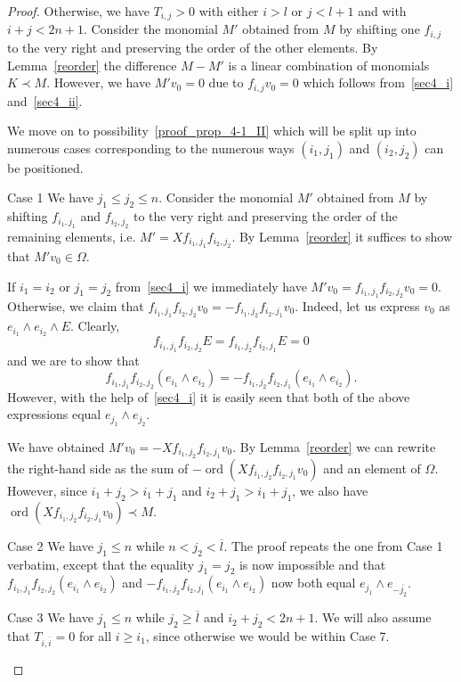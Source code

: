 \documentclass[10pt,a4paper]{article}
\theoremstyle{remark}\newtheorem{rema}[theo]{Remark}
\newenvironment{enonce*}[2][]{\par\smallskip\noindent\textbf{#2.}\ }{\par\smallskip}
\DeclareMathOperator{\ord}{ord}
\begin{document}
\begin{proof}
Otherwise, we have $T_{i,j}>0$ with either $i>l$ or $j<l+1$ and with $i+j<2n+1$. Consider the monomial $M'$ obtained from $M$ by shifting one $f_{i,j}$ to the very right and preserving the order of the other elements. By Lemma~\ref{reorder} the difference $M-M'$ is a linear combination of monomials $K\prec M$. However, we have $M'v_0=0$ due to $f_{i,j}v_0=0$ which follows from~\ref{sec4_i} and~\ref{sec4_ii}.

We move on to possibility~\ref{proof_prop_4-1_II} which will be split up into numerous cases corresponding to the numerous ways $(i_1,j_1)$ and $(i_2,j_2)$ can be positioned.

\begin{enonce*}[remark]{Case 1} We have $j_1\le j_2\le n$. Consider the monomial $M'$ obtained from $M$ by shifting $f_{i_1,j_1}$ and $f_{i_2,j_2}$ to the very right and preserving the order of the remaining elements, i.e. $M'=X f_{i_1,j_1}f_{i_2,j_2}$. By Lemma~\ref{reorder} it suffices to show that $M'v_0\in\Omega$.

If $i_1=i_2$ or $j_1=j_2$ from~\ref{sec4_i} we immediately have $M'v_0=f_{i_1,j_1}f_{i_2,j_2}v_0=0$. Otherwise, we claim that $f_{i_1,j_1}f_{i_2,j_2} v_0=-f_{i_1,j_2}f_{i_2,j_1}v_0$. Indeed, let us express $v_0$ as $e_{i_1}\wedge e_{i_2}\wedge E$. Clearly,
\[
f_{i_1,j_1}f_{i_2,j_2} E=f_{i_1,j_2}f_{i_2,j_1}E=0
\]
and we are to show that
\[
f_{i_1,j_1}f_{i_2,j_2}(e_{i_1}\wedge e_{i_2})=-f_{i_1,j_2}f_{i_2,j_1}(e_{i_1}\wedge e_{i_2}).
\]
However, with the help of~\ref{sec4_i} it is easily seen that both of the above expressions equal $e_{j_1}\wedge e_{j_2}$.

We have obtained $M'v_0=-Xf_{i_1,j_2}f_{i_2,j_1}v_0$. By Lemma~\ref{reorder} we can rewrite the right-hand side as the sum of $-\ord(Xf_{i_1,j_2}f_{i_2,j_1}v_0)$ and an element of $\Omega$. However, since $i_1+j_2>i_1+j_1$ and $i_2+j_1>i_1+j_1$, we also have $\ord(Xf_{i_1,j_2}f_{i_2,j_1}v_0)\prec M$.
\end{enonce*}

\begin{enonce*}[remark]{Case 2} We have $j_1\le n$ while $n<j_2<\overline l$. The proof repeats the one from Case 1 verbatim, except that the equality $j_1=j_2$ is now impossible and that $f_{i_1,j_1}f_{i_2,j_2}(e_{i_1}\wedge e_{i_2})$ and $-f_{i_1,j_2}f_{i_2,j_1}(e_{i_1}\wedge e_{i_2})$ now both equal $e_{j_1}\wedge e_{-\overline{j_2}}$.
\end{enonce*}

\begin{enonce*}[remark]{Case 3} We have $j_1\le n$ while $j_2\ge\overline l$ and $i_2+j_2<2n+1$. We will also assume that $T_{i,\overline i}=0$ for all $i\ge i_1$, since otherwise we would be within Case 7.


\end{enonce*}
\end{proof}
\end{document}

